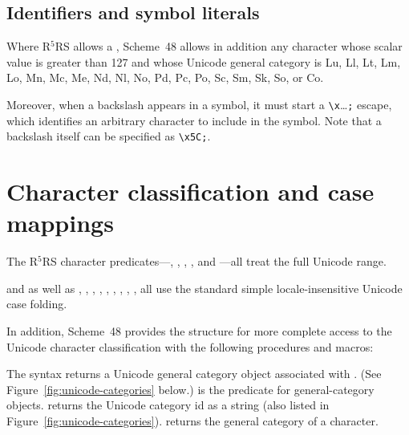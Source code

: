 \subsection{Identifiers and symbol literals}

Where R$^5$RS allows a , Scheme~48 allows in addition any
character whose scalar value is greater than 127 and whose Unicode
general category is Lu, Ll, Lt, Lm, Lo, Mn, Mc, Me, Nd, Nl, No, Pd, Pc,
Po, Sc, Sm, Sk, So, or Co.

Moreover, when a backslash appears in a symbol, it must start a
\verb|\x|\ldots{}\verb|;| escape, which identifies an
arbitrary character to include in the symbol. Note that a backslash
itself can be specified as \verb|\x5C;|.

\section{Character classification and case mappings}

The R$^5$RS character predicates---,
, ,
, and ---all treat the full
Unicode range.

 and  as well as
, , ,
, , ,
, , ,
 all use the standard simple locale-insensitive
Unicode case folding.

In addition, Scheme~48 provides the  structure
for more complete access to the Unicode character classification with
the following procedures and macros:
%
\begin{protos}
\end{protos}
%
The syntax  returns a Unicode general category
object associated with .  (See
Figure~\ref{fig:unicode-categories} below.)  
is the predicate for general-category objects.
 returns the Unicode category id as a string
(also listed in Figure~\ref{fig:unicode-categories}).
 returns the general category of a character.


